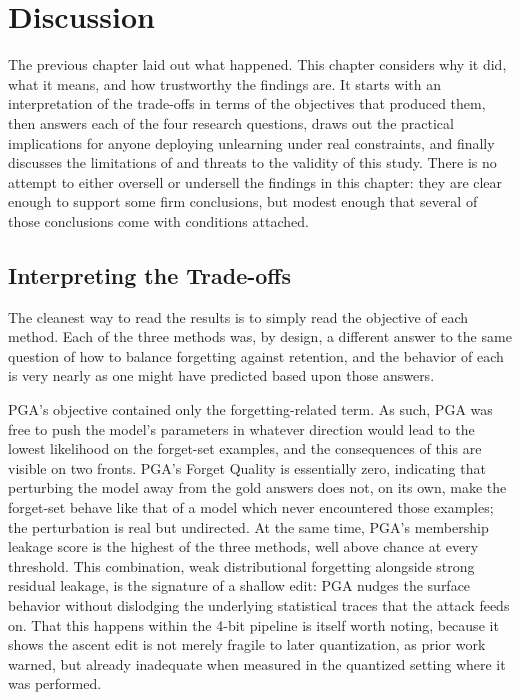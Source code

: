 \documentclass[a4paper,12pt]{report}
\begin{document}
\chapter{Discussion}
\label{chap:discussion}

The previous chapter laid out what happened. This chapter considers why it did, what it means, and how trustworthy the findings are. It starts with an interpretation of the trade-offs in terms of the objectives that produced them, then answers each of the four research questions, draws out the practical implications for anyone deploying unlearning under real constraints, and finally discusses the limitations of and threats to the validity of this study. There is no attempt to either oversell or undersell the findings in this chapter: they are clear enough to support some firm conclusions, but modest enough that several of those conclusions come with conditions attached.

\section{Interpreting the Trade-offs}
\label{sec:disc-interpret}
The cleanest way to read the results is to simply read the objective of each method. Each of the three methods was, by design, a different answer to the same question of how to balance forgetting against retention, and the behavior of each is very nearly as one might have predicted based upon those answers.

PGA's objective contained only the forgetting-related term. As such, PGA was free to push the model's parameters in whatever direction would lead to the lowest likelihood on the forget-set examples, and the consequences of this are visible on two fronts. PGA's Forget Quality is essentially zero, indicating that perturbing the model away from the gold answers does not, on its own, make the forget-set behave like that of a model which never encountered those examples; the perturbation is real but undirected. At the same time, PGA's membership leakage score is the highest of the three methods, well above chance at every threshold. This combination, weak distributional forgetting alongside strong residual leakage, is the signature of a shallow edit: PGA nudges the surface behavior without dislodging the underlying statistical traces that the attack feeds on. That this happens within the 4-bit pipeline is itself worth noting, because it shows the ascent edit is not merely fragile to later quantization, as prior work warned, but already inadequate when measured in the quantized setting where it was performed.
\end{document}
